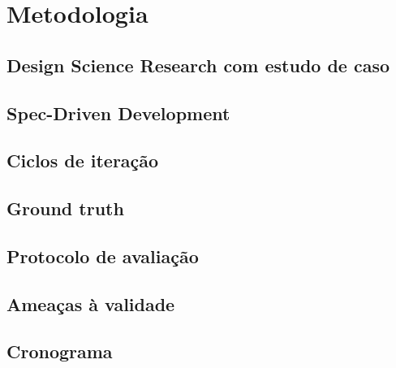 \chapter{Metodologia}
\label{chap:metodologia}


\section{Design Science Research com estudo de caso}
\label{sec:metodologia-design-science-research-com-estudo-de-caso}

\section{Spec-Driven Development}
\label{sec:metodologia-spec-driven-development}

\section{Ciclos de iteração}
\label{sec:metodologia-ciclos-de-iteracao}

\section{Ground truth}
\label{sec:metodologia-ground-truth}

\section{Protocolo de avaliação}
\label{sec:metodologia-protocolo-de-avaliacao}

\section{Ameaças à validade}
\label{sec:metodologia-ameacas-a-validade}

\section{Cronograma}
\label{sec:metodologia-cronograma}
